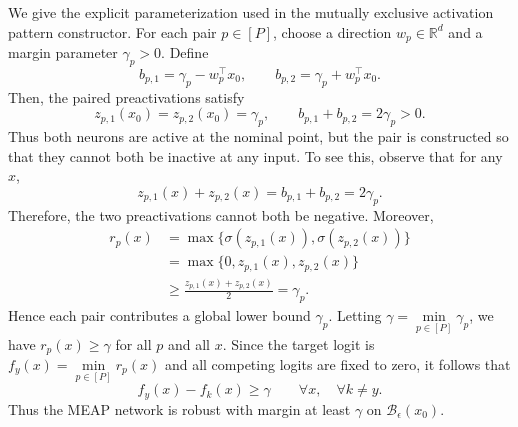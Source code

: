 \documentclass{article}
\theoremstyle{definition}
\begin{document}
We give the explicit parameterization used in the mutually exclusive activation pattern constructor. For each pair $p\in[P]$, choose a direction $w_p\in\mathbb R^d$ and a margin parameter $\gamma_p>0$. Define
\begin{equation}
    b_{p,1}=\gamma_p-w_p^\top x_0,
    \qquad
    b_{p,2}=\gamma_p+w_p^\top x_0.
    \label{eq:meap_bias_parameterization}
\end{equation}
Then, the paired preactivations satisfy
\begin{equation}
    z_{p,1}(x_0)=z_{p,2}(x_0)=\gamma_p,
    \qquad
    b_{p,1}+b_{p,2}=2\gamma_p>0.
    \label{eq:meap_nominal_values}
\end{equation}
Thus both neurons are active at the nominal point, but the pair is constructed so that they cannot both be inactive at any input. To see this, observe that for any $x$,
\begin{equation}
    z_{p,1}(x)+z_{p,2}(x)=b_{p,1}+b_{p,2}=2\gamma_p.
    \label{eq:meap_sum_identity}
\end{equation}
Therefore, the two preactivations cannot both be negative. Moreover,
\begin{equation}
\begin{aligned}
    r_p(x)&=\max\{\sigma(z_{p,1}(x)),\sigma(z_{p,2}(x))\} \\
    &=\max\{0,z_{p,1}(x),z_{p,2}(x)\} \\
    &\geq\frac{z_{p,1}(x)+z_{p,2}(x)}{2}=\gamma_p.
\end{aligned}
\label{eq:meap_pair_lower_bound}
\end{equation}
Hence each pair contributes a global lower bound $\gamma_p$. Letting $\gamma=\min\limits_{p\in[P]}\gamma_p$, we have $r_p(x)\geq\gamma$ for all $p$ and all $x$. Since the target logit is $f_y(x)=\min\limits_{p\in[P]}r_p(x)$ and all competing logits are fixed to zero, it follows that
\begin{equation}
    f_y(x)-f_k(x)\geq \gamma
    \qquad
    \forall x,\quad \forall k\neq y.
    \label{eq:meap_global_certificate}
\end{equation}
Thus the MEAP network is robust with margin at least $\gamma$ on $\mathcal B_\epsilon(x_0)$.
\end{document}
